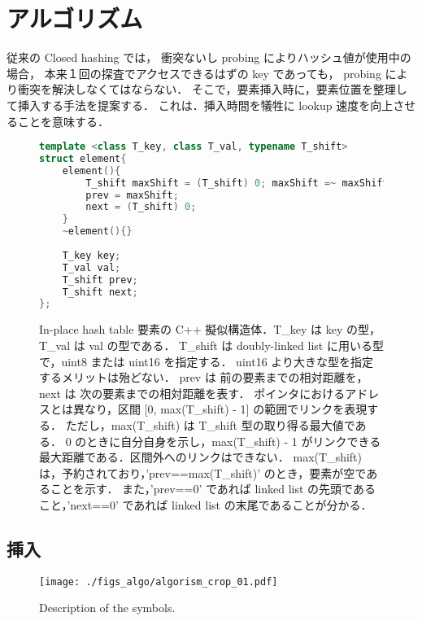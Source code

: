 \chapter{アルゴリズム}
\label{chap_Algorism}

従来の Closed hashing では，
衝突ないし probing によりハッシュ値が使用中の場合，
本来１回の探査でアクセスできるはずの key であっても，
probing により衝突を解決しなくてはならない．
そこで，要素挿入時に，要素位置を整理して挿入する手法を提案する．
これは．挿入時間を犠牲に lookup 速度を向上させることを意味する．

\begin{figure}[h] %
\begin{lstlisting}[language=C++]
template <class T_key, class T_val, typename T_shift>
struct element{
	element(){
		T_shift maxShift = (T_shift) 0; maxShift =~ maxShift;
		prev = maxShift;
		next = (T_shift) 0;
	}
	~element(){}
	
	T_key key;
	T_val val;
	T_shift prev;
	T_shift next;
};
\end{lstlisting}
\caption{
  In-place hash table 要素の C++ 擬似構造体．T\_key は key の型，T\_val は val の型である．
  T\_shift は doubly-linked list に用いる型で，uint8 または uint16 を指定する．
  uint16 より大きな型を指定するメリットは殆どない．
  prev は 前の要素までの相対距離を，next は 次の要素までの相対距離を表す．
  ポインタにおけるアドレスとは異なり，区間 [0, max(T\_shift) - 1] の範囲でリンクを表現する．
  ただし，max(T\_shift) は T\_shift 型の取り得る最大値である．
  0 のときに自分自身を示し，max(T\_shift) - 1 がリンクできる最大距離である．区間外へのリンクはできない．
  max(T\_shift) は，予約されており，'prev==max(T\_shift)' のとき，要素が空であることを示す．
  また，'prev==0' であれば linked list の先頭であること，'next==0' であれば linked list の末尾であることが分かる．
}
\label{fig_IpCHashT_struct}
\end{figure}



\section{挿入}

\begin{figure}[h]
  \texttt{[image: ./figs\_algo/algorism\_crop\_01.pdf]}
  \caption{
    Description of the symbols.
  }
  \label{fig_IpCHashT_fig_description}
\end{figure}

